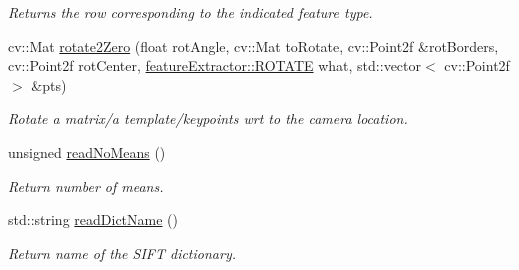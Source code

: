 \begin{DoxyCompactItemize}
\begin{DoxyCompactList}\small\item\em Returns the row corresponding to the indicated feature type. \item\end{DoxyCompactList}\item 
\hypertarget{classfeatureExtractor_aec970aa129deac0c1e938d9144a2e5d8}{
cv::Mat \hyperlink{classfeatureExtractor_aec970aa129deac0c1e938d9144a2e5d8}{rotate2Zero} (float rotAngle, cv::Mat toRotate, cv::Point2f \&rotBorders, cv::Point2f rotCenter, \hyperlink{classfeatureExtractor_a99e9f9e991fdf79bafc52c2ebbe51710}{featureExtractor::ROTATE} what, std::vector$<$ cv::Point2f $>$ \&pts)}
\label{classfeatureExtractor_aec970aa129deac0c1e938d9144a2e5d8}

\begin{DoxyCompactList}\small\item\em Rotate a matrix/a template/keypoints wrt to the camera location. \item\end{DoxyCompactList}\item 
\hypertarget{classfeatureExtractor_a94f5fb634c94b61eb15043e8a762e594}{
unsigned \hyperlink{classfeatureExtractor_a94f5fb634c94b61eb15043e8a762e594}{readNoMeans} ()}
\label{classfeatureExtractor_a94f5fb634c94b61eb15043e8a762e594}

\begin{DoxyCompactList}\small\item\em Return number of means. \item\end{DoxyCompactList}\item 
\hypertarget{classfeatureExtractor_ab5044508f002714ab048e2c639e8d870}{
std::string \hyperlink{classfeatureExtractor_ab5044508f002714ab048e2c639e8d870}{readDictName} ()}
\label{classfeatureExtractor_ab5044508f002714ab048e2c639e8d870}

\begin{DoxyCompactList}\small\item\em Return name of the SIFT dictionary. \item\end{DoxyCompactList}\end{DoxyCompactItemize}
